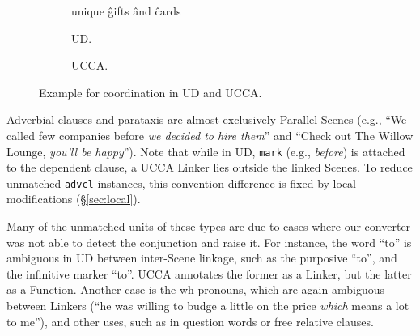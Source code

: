 \documentclass[11pt,a4paper]{article}
\begin{document}
\begin{figure}[th]
  \centering
\begin{subfigure}{.45\columnwidth}
    \begin{dependency}[text only label, label style={above,font=\tt}, font=\small, edge unit distance=2ex]
    \begin{deptext}[column sep=.1em,ampersand replacement=\^]
    unique \^ gifts \^ and \^ cards \\
    \end{deptext}
    \end{dependency}
    \caption{UD.\label{fig:conj_ud}}
\end{subfigure}
\hfill
\begin{subfigure}{.45\columnwidth}
    \caption{UCCA.\label{fig:conj_ucca}}
 \end{subfigure}
 \caption{Example for coordination in UD and UCCA.\label{fig:conj}}
\end{figure}

Adverbial clauses and parataxis
are almost exclusively Parallel Scenes
(e.g., ``We called few companies before \textit{we decided to hire them}''
and ``Check out The Willow Lounge, \textit{you'll be happy}'').
Note that while in UD, \texttt{mark} (e.g., \textit{before})
is attached to the dependent clause,
a UCCA Linker lies outside the linked Scenes.
To reduce unmatched \texttt{advcl} instances,
this convention difference is fixed by local modifications
(\S\ref{sec:local}).

Many of the unmatched units of these types are due to cases where our converter was not able to detect the conjunction 
and raise it. 
For instance, the word ``to'' is ambiguous in UD between inter-Scene linkage, such as the purposive ``to'', and
the infinitive marker ``to''. UCCA annotates the former as a Linker, but the latter as a Function.
Another case is the wh-pronouns, which are again ambiguous between Linkers (``he was willing to budge a little on the price {\it which} means a lot to me''),
and other uses, such as in question words or free relative clauses.
\end{document}
